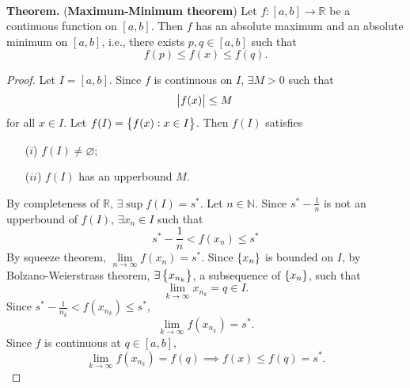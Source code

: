 \documentclass[12pt,a4paper]{article}
\newcommand{\dispsty}{\displaystyle}
\begin{document}
\
\begin{tcolorbox}[colback=white]
	\textbf{Theorem.} (\textbf{Maximum-Minimum theorem}) Let $f:[a,b]\to\mathbb{R}$ be a continuous function on $[a,b]$. Then $f$ has an absolute maximum and an absolute minimum on $[a,b]$, i.e., there exists $p,q\in[a,b]$ such that \[
	f(p)\leq f(x)\leq f(q).
	\]\tcblower\begin{proof}
		Let $I=[a,b]$. Since $f$ is continuous on $I$, $\exists M>0$ such that \[
		\abs{f(x)}\leq M
		\] for all $x\in I$. Let $f(I)=\set{f(x):x\in I}$. Then $f(I)$ satisfies \begin{itemize}
			\item[($i$)] $f(I)\neq\varnothing$;
			\item[($ii$)] $f(I)$ has an upperbound $M$.
		\end{itemize} By completeness of $\mathbb{R}$, $\exists\sup f(I)=s^*$. Let $n\in\mathbb{N}$. Since $s^*-\dispsty\frac{1}{n}$ is not an upperbound of $f(I)$, $\exists x_n\in I$ such that \[
	s^*-\frac{1}{n}<f(x_n)\leq s^*
	\] By squeeze theorem, $\lim\limits_{n\to\infty}f(x_n)=s^*$. Since $\set{x_n}$ is bounded on $I$, by Bolzano-Weierstrass theorem, $\exists\set{x_{n_k}}$, a subsequence of $\set{x_n}$, such that \[
	\lim\limits_{k\to\infty}x_{n_k}=q\in I.
	\] Since $s^*-\dispsty\frac{1}{n_k}<f(x_{n_k})\leq s^*$, \[
	\lim\limits_{k\to\infty}f(x_{n_k})=s^*.
	\] Since $f$ is continuous at $q\in[a,b]$, \[
	\lim\limits_{k\to\infty}f(x_{n_k})=f(q)\implies f(x)\leq f(q)=s^*.
	\]
	\end{proof}
\end{tcolorbox}
\
\end{document}
